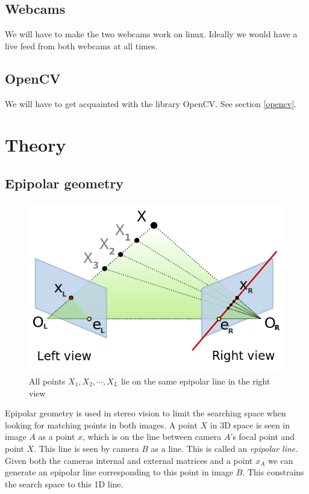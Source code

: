 \documentclass[a4paper]{article}
\begin{document}
\subsection{Webcams}
We will have to make the two webcams work on linux. Ideally we would have a live
feed from both webcams at all times.

\subsection{OpenCV}
We will have to get acquainted with the library OpenCV. See section
\ref{opencv}.

\section{Theory}

\subsection{Epipolar geometry}
\label{epipolar}

\begin{figure}[h!]
  \label{fig:epipole}
  \centering
  \includegraphics[width=1.0\textwidth]{Epipolar_geometry}
  \caption{All points $X_{1}, X_{2}, \cdots, X_{L}$ lie on the same epipolar line in the right view}
\end{figure}

Epipolar geometry is used in stereo vision to limit the searching space when
looking for matching points in both images. A point $X$ in 3D space is seen in
image $A$ as a point $x$, which is on the line between camera $A$'s focal point
and point $X$. This line is seen by camera $B$ as a line. This is called an
\emph{epipolar line}. Given both the cameras internal and external matrices and
a point $x_A$ we can generate an epipolar line corresponding to this point in
image $B$. This constrains the search space to this 1D line.
\end{document}
